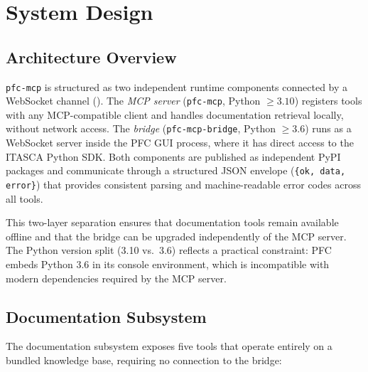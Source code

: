 \section{System Design}
\label{sec:design}

\subsection{Architecture Overview}
\label{sec:design:overview}


\texttt{pfc-mcp} is structured as two independent runtime components connected by a WebSocket channel (). The \emph{MCP server} (\texttt{pfc-mcp}, Python $\geq 3.10$) registers tools with any MCP-compatible client and handles documentation retrieval locally, without network access. The \emph{bridge} (\texttt{pfc-mcp-bridge}, Python $\geq 3.6$) runs as a WebSocket server inside the PFC GUI process, where it has direct access to the ITASCA Python SDK. Both components are published as independent PyPI packages and communicate through a structured JSON envelope (\texttt{\{ok, data, error\}}) that provides consistent parsing and machine-readable error codes across all tools.

This two-layer separation ensures that documentation tools remain available offline and that the bridge can be upgraded independently of the MCP server. The Python version split (3.10 vs.\ 3.6) reflects a practical constraint: PFC embeds Python 3.6 in its console environment, which is incompatible with modern dependencies required by the MCP server.

\subsection{Documentation Subsystem}
\label{sec:design:docs}


The documentation subsystem exposes five tools that operate entirely on a bundled knowledge base, requiring no connection to the bridge:

